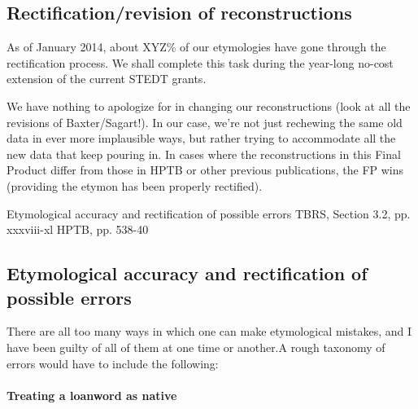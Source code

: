 	
\subsection{Rectification/revision of reconstructions}

As of January 2014, about XYZ\% of our etymologies have gone through the rectification process. We shall complete this task during the year-long no-cost extension of the current STEDT grants.

We have nothing to apologize for in changing our reconstructions (look at all the revisions of Baxter/Sagart!). In our case, we’re not just rechewing the same old data in ever more implausible ways, but rather trying to accommodate all the new data that keep pouring in. 
In cases where the reconstructions in this Final Product differ from those in HPTB or other previous publications, the FP wins (providing the etymon has been properly rectified).

Etymological accuracy and rectification of possible errors
	TBRS, Section 3.2, pp. xxxviii-xl
	HPTB, pp. 538-40
	
\subsection[Etymological accuracy and rectification of possible errors]{Etymological accuracy and rectification of possible errors}

There are all too many ways in which one can make etymological mistakes, and
I have been guilty of all of them at one time or another.\footnotemark A rough taxonomy of
errors would have to include the following:


\paragraph{Treating a loanword as native}

